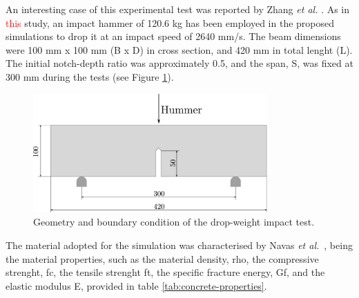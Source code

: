\documentclass[preprint,12pt,a4paper]{elsarticle}
\begin{document}
An interesting case of this experimental test was reported by Zhang {\it et al.} \cite{Zhang_2010a}. As in \textcolor{red}{this} study, an impact hammer of 120.6 kg has been employed in the proposed simulations to drop it at an impact
speed of 2640 mm/s. The beam dimensions were 100 mm x 100 mm (B x D)
in cross section, and 420 mm in total lenght (L). The initial
notch-depth ratio was approximately 0.5, and the span, S, was fixed at
300 mm during the tests (see Figure
\ref{fig:geometry-drop-weight-impact-test}).
\begin{figure}
  \centering
  \includegraphics[width=0.8\textwidth]{./Figure-impact-test}
  \caption{Geometry and boundary condition of the drop-weight impact test.}
  \label{fig:geometry-drop-weight-impact-test}
\end{figure}
The material adopted for the simulation was characterised by Navas
{\it et al.}~\cite{Navas_2017_ES}, being the material properties, such
as the material density, \gls{rho}, the compressive strenght, \gls{fc},
the tensile strenght \gls{ft}, the specific fracture energy, \gls{Gf},
and the elastic modulus \gls{E}, provided in table \ref{tab:concrete-properties}.\\
\end{document}
